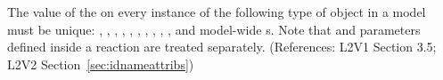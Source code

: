 The value of the   on every instance of the
following type of object in a model must be unique: \Model,
\FunctionDefinition, \CompartmentType, \Compartment, \SpeciesType,
\Species, \Reaction, \SpeciesReference, \ModifierSpeciesReference,
\Event, and model-wide \Parameter{}s.  Note that \UnitDefinition
and parameters defined inside a reaction are treated separately.
(References: L2V1 Section 3.5; L2V2
Section~\ref{sec:idnameattribs})
